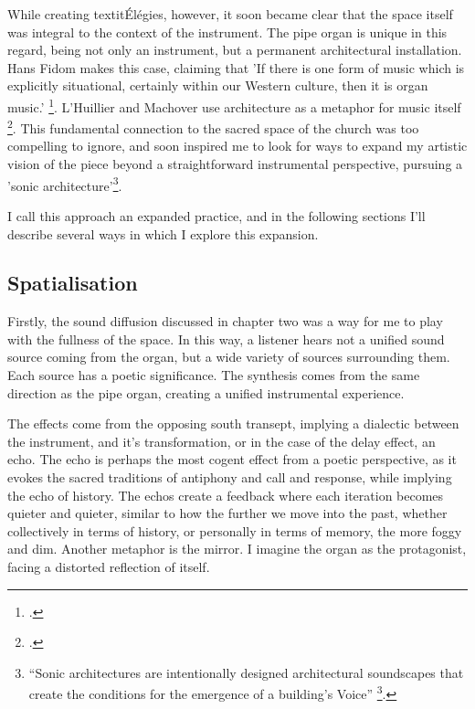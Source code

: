 \documentclass[12pt,twoside,maitrise]{dms_ks}
\theoremstyle{definition}
\begin{document}
{While creating textit{Élégies}, however, it soon became clear that the space itself was integral to the context of the instrument. 
The pipe organ is unique in this regard, being not only an instrument, but a permanent architectural installation. 
Hans Fidom makes this case, claiming that 'If there is one form of music which is explicitly situational, certainly within our Western culture, then it is organ music.' \footcite[23]{fidom_music_2012}. 
L'Huillier and Machover use architecture as a metaphor for music itself \footcite[361]{lhuillier_spaces_2018}. 
This fundamental connection to the sacred space of the church was too compelling to ignore, and soon inspired me to look for ways to expand my artistic vision of the piece beyond a straightforward instrumental perspective, pursuing a 'sonic architecture'\footnote{“Sonic architectures are intentionally designed architectural soundscapes that create the conditions for the emergence of a building’s Voice” \footcite{lacey_site-specific_2014}.}.

I call this approach an expanded practice, and in the following sections I'll describe several ways in which I explore this expansion.

\subsection{Spatialisation}

Firstly, the sound diffusion discussed in chapter two was a way for me to play with the fullness of the space. 
In this way, a listener hears not a unified sound source coming from the organ, but a wide variety of sources surrounding them. 
Each source has a poetic significance. 
The synthesis comes from the same direction as the pipe organ, creating a unified instrumental experience.

The effects come from the opposing south transept, implying a dialectic between the instrument, and it's transformation, or in the case of the delay effect, an echo. 
The echo is perhaps the most cogent effect from a poetic perspective, as it evokes the sacred traditions of antiphony and call and response, while implying the echo of history. 
The echos create a feedback where each iteration becomes quieter and quieter, similar to how the further we move into the past, whether collectively in terms of history, or personally in terms of memory, the more foggy and dim. 
Another metaphor is the mirror. 
I imagine the organ as the protagonist, facing a distorted reflection of itself.

}
\end{document}
